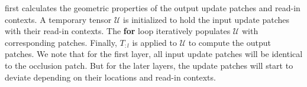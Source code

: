 \begin{algorithm}[t]
\end{algorithm}



 first calculates the geometric properties of the output update patches and read-in contexts. A temporary tensor $\mathcal{U}$ is initialized to hold the input update patches with their read-in contexts. The \textbf{for} loop iteratively populates $\mathcal{U}$ with corresponding patches. Finally, $T_{:l}$ is applied to $\mathcal{U}$ to compute the output patches. We note that for the first layer, all input update patches will be identical to the occlusion patch. But for the later layers, the update patches will start to deviate depending on their locations and read-in contexts.


